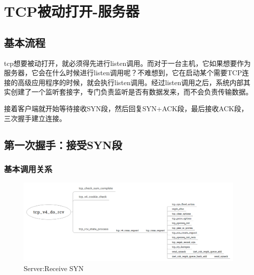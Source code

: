 \section{TCP被动打开-服务器}
\label{sec:tcp_server_connect}
        \subsection{基本流程}
            tcp想要被动打开，就必须得先进行listen调用。而对于一台主机，它如果想要作为服务器，它会在什么时候进行listen调用呢？不难想到，它在启动某个需要TCP连接的高级应用程序的时候，就会执行listen调用。经过listen调用之后，系统内部其实创建了一个监听套接字，专门负责监听是否有数据发来，而不会负责传输数据。

			接着客户端就开始等待接收SYN段，然后回复SYN+ACK段，最后接收ACK段，三次握手建立连接。 
        \subsection{第一次握手：接受SYN段}
            \subsubsection{基本调用关系}
                \begin{figure}[htb]        
                    \centering
                    \includegraphics[width=\textwidth]  {images/Server:Receive SYN.png}
					\caption{Server:Receive SYN}
					\label{Server:Receive SYN}
                \end{figure}       
